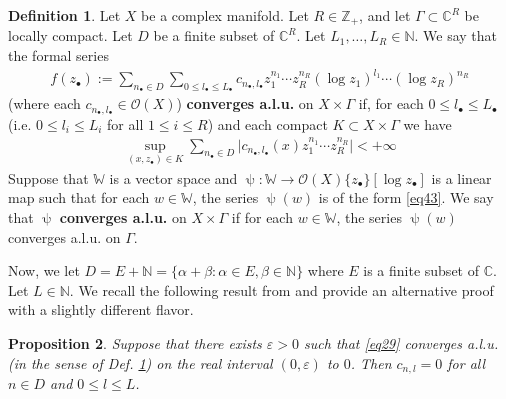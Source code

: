 \documentclass[11pt,b5paper,notitlepage]{article}
\theoremstyle{definition}
\newtheorem{df}{Definition}[section]
\theoremstyle{plain}
\newtheorem{pp}[df]{Proposition}
\newcommand{\blt}{\bullet}
\newcommand{\Wbb}{\mathbb W}
\newcommand{\Cbb}{\mathbb C}
\newcommand{\Nbb}{\mathbb N}
\newcommand{\Zbb}{\mathbb Z}
\newcommand{\<}{\left\langle}
\renewcommand{\>}{\right\rangle}
\newcommand{\MO}{\mathcal{O}}
\newcommand{\eps}{\varepsilon}
\numberwithin{equation}{section}
\begin{document}



\begin{df}\label{lb19}
Let $X$ be a complex manifold. Let $R\in\Zbb_+$, and let $\Gamma\subset\Cbb^R$ be locally compact. Let $D$ be a finite subset of $\Cbb^R$. Let $L_1,\dots,L_R\in\Nbb$. We say that  the formal series
\begin{align}\label{eq43}
f(z_\blt):=        \sum_{n_\blt\in D}\sum_{0\leq l_\blt\leq L_\blt}c_{n_\blt,l_\blt} z_1^{n_1}\cdots z_R^{n_R} (\log z_1)^{l_1}\cdots(\log z_R)^{n_R}
    \end{align}
(where each $c_{n_\blt,l_\blt}\in \MO(X)$) \textbf{converges a.l.u.} on $X\times\Gamma$ if, for each $0\leq l_\blt\leq L_\blt$ (i.e. $0\leq l_i\leq L_i$ for all $1\leq i\leq R$) and each compact $K\subset X\times\Gamma$  we have
\begin{align}\label{eq29}
\sup_{(x,z_\blt)\in K}\sum_{n_\blt\in D}\big|c_{n_\blt,l_\blt}(x) z_1^{n_1}\cdots z_R^{n_R}\big|<+\infty
\end{align}
Suppose that $\Wbb$ is a vector space and $\uppsi:\Wbb\rightarrow\MO(X)\{z_\blt\}[\log z_\blt]$ is a linear map such that for each $w\in\Wbb$, the series $\uppsi(w)$ is of the form \eqref{eq43}. We say that $\uppsi$ \textbf{converges a.l.u.} on $X\times\Gamma$ if for each $w\in\Wbb$, the series $\uppsi(w)$ converges a.l.u. on $\Gamma$.
\end{df}


Now, we let $D=E+\Nbb=\{\alpha+\beta:\alpha\in E,\beta\in \Nbb\}$ where $E$ is a finite subset of $\Cbb$. Let $L\in\Nbb$. We recall the following result from \cite[Prop. 2.1]{Huang-applicability} and provide an alternative proof with a slightly different flavor.

\begin{pp}\label{geometry11}
Suppose that there exists $\eps>0$ such that \eqref{eq29} converges a.l.u. (in the sense of Def. \ref{lb19}) on the real interval $(0,\eps)$ to $0$. Then $c_{n,l}=0$ for all $n\in D$ and $0\leq l\leq L$.
\end{pp}
\end{document}
